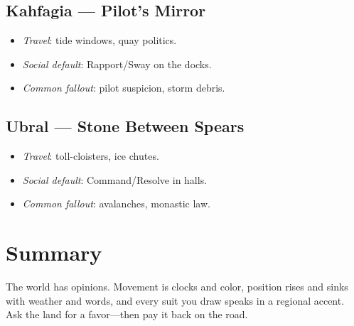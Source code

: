 \begin{multicols}{2}
\subsection*{Kahfagia — Pilot’s Mirror}
\begin{itemize}
  \item \emph{Travel}: tide windows, quay politics.
  \item \emph{Social default}: Rapport/Sway on the docks.
  \item \emph{Common fallout}: pilot suspicion, storm debris.
\end{itemize}

\subsection*{Ubral — Stone Between Spears}
\begin{itemize}
  \item \emph{Travel}: toll-cloisters, ice chutes.
  \item \emph{Social default}: Command/Resolve in halls.
  \item \emph{Common fallout}: avalanches, monastic law.
\end{itemize}

\section{Summary}
The world has opinions. Movement is clocks and color, position rises and sinks with weather and words, and every suit you draw speaks in a regional accent. Ask the land for a favor—then pay it back on the road.

\end{multicols}
